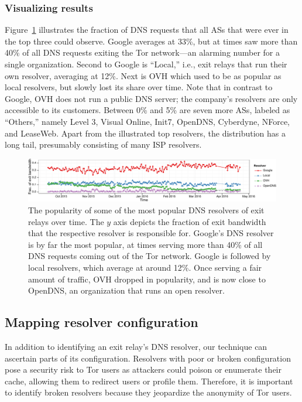 \subsubsection{Visualizing results}
Figure~\ref{fig:exit-resolvers} illustrates the fraction of DNS requests that
all ASs that were ever in the top three could observe.  Google averages at
33\%, but at times saw more than 40\% of all DNS requests exiting the Tor
network---an alarming number for a single organization.  Second to Google is
``Local,'' i.e., exit relays that run their own resolver, averaging at 12\%.
Next is OVH which used to be as popular as local resolvers, but slowly lost its
share over time.  Note that in contrast to Google, OVH does not run a public
DNS server; the company's resolvers are only accessible to its customers.
Between 0\% and 5\% are seven more ASs, labeled as ``Others,'' namely Level 3,
Visual Online, Init7, OpenDNS, Cyberdyne, NForce, and LeaseWeb.  Apart from the
illustrated top resolvers, the distribution has a long tail, presumably
consisting of many ISP resolvers.

\begin{figure}[t]
	\centering
	\includegraphics[width=\linewidth]{figures/exit-resolvers.pdf}
	\caption{The popularity of some of the most popular DNS resolvers of exit
		relays over time.  The $y$ axis depicts the fraction of exit bandwidth
		that the respective resolver is responsible for.  Google's DNS resolver
		is by far the most popular, at times serving more than 40\% of all DNS
		requests coming out of the Tor network.  Google is followed by local
		resolvers, which average at around 12\%.  Once serving a fair amount of
		traffic, OVH dropped in popularity, and is now close to OpenDNS, an
		organization that runs an open resolver.}
	\label{fig:exit-resolvers}
\end{figure}

\iffalse
\subsection{Mapping resolver configuration}
\label{sec:mapping-configuration}
In addition to identifying an exit relay's DNS resolver, our technique can
ascertain parts of its configuration.  Resolvers with poor or broken
configuration pose a security risk to Tor users as attackers could poison or
enumerate their cache, allowing them to redirect users or profile them.
Therefore, it is important to identify broken resolvers because they jeopardize
the anonymity of Tor users.


